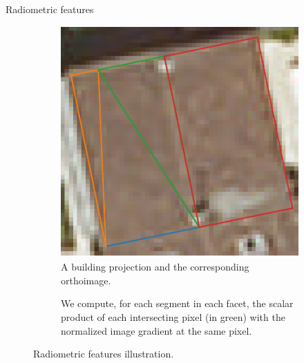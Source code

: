 \documentclass{beamer}
\begin{document}
            \begin{frame}[plain]{Radiometric features}
                \begin{figure}
                    \begin{subfigure}{.48\textwidth}
                        \includegraphics[width=\textwidth]{images/radio_vector}
                        \caption{\label{fig::ortho_sup} A building projection and the corresponding orthoimage.}
                    \end{subfigure}
                    \begin{subfigure}{.48\textwidth}
                        
                        \caption{\label{fig::hist} We compute, for each segment in each facet, the scalar product of each intersecting pixel (in green) with the normalized image gradient at the same pixel.}
                    \end{subfigure}
                    \caption{\label{fig::radiometric} Radiometric features illustration.}
                \end{figure}
            \end{frame}
\end{document}
